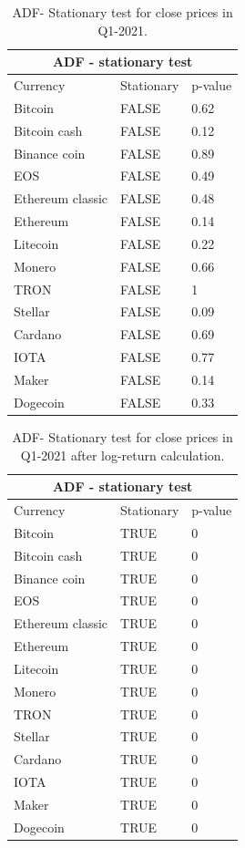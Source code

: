 \documentclass[final]{cvpr}
\begin{document}
\begin{table}[h!]
\centering
 \begin{tabular}{ |p{2.5cm}|p{1.5cm}|p{1.5cm}|}
 \hline
 \multicolumn{3}{|c|}{\textbf{ADF - stationary test}} \\
 \hline
 Currency & Stationary & p-value \\
 \hline
 Bitcoin  & FALSE & 0.62 \\
 \hline
 Bitcoin cash  & FALSE & 0.12 \\
 \hline
 Binance coin  & FALSE & 0.89 \\
 \hline
 EOS  & FALSE & 0.49 \\
 \hline
 Ethereum classic  & FALSE & 0.48 \\
 \hline
 Ethereum  & FALSE & 0.14 \\
 \hline
 Litecoin  & FALSE & 0.22 \\
 \hline
 Monero  & FALSE & 0.66 \\
 \hline
 TRON  & FALSE & 1 \\
 \hline
 Stellar  & FALSE & 0.09 \\
 \hline
 Cardano  & FALSE & 0.69 \\
 \hline
  IOTA  & FALSE & 0.77 \\
 \hline
  Maker & FALSE & 0.14 \\
 \hline
  Dogecoin  & FALSE & 0.33 \\
 \hline
  \end{tabular}
  \caption{ADF- Stationary test for close prices in Q1-2021.}
 \label{tab:ADF-C}
\end{table}


\begin{table}[h!]
\centering
 \begin{tabular}{ |p{2.5cm}|p{1.5cm}|p{1.5cm}|}
 \hline
 \multicolumn{3}{|c|}{\textbf{ADF - stationary test}} \\
 \hline
 Currency & Stationary & p-value \\
 \hline
 Bitcoin  & TRUE & 0 \\
 \hline
 Bitcoin cash  & TRUE & 0 \\
 \hline
 Binance coin  & TRUE & 0\\
 \hline
 EOS  & TRUE & 0 \\
 \hline
 Ethereum classic  & TRUE & 0  \\
 \hline
 Ethereum  & TRUE & 0  \\
 \hline
 Litecoin  & TRUE & 0  \\
 \hline
 Monero  & TRUE & 0  \\
 \hline
 TRON  & TRUE & 0  \\
 \hline
 Stellar  & TRUE & 0  \\
 \hline
 Cardano  & TRUE & 0  \\
 \hline
  IOTA  & TRUE & 0  \\
 \hline
  Maker & TRUE & 0  \\
 \hline
  Dogecoin  & TRUE & 0  \\
 \hline
  \end{tabular}
  \caption{ADF- Stationary test for close prices in Q1-2021 after log-return calculation.}
 \label{tab:ADF1-C}
\end{table}
\end{document}
